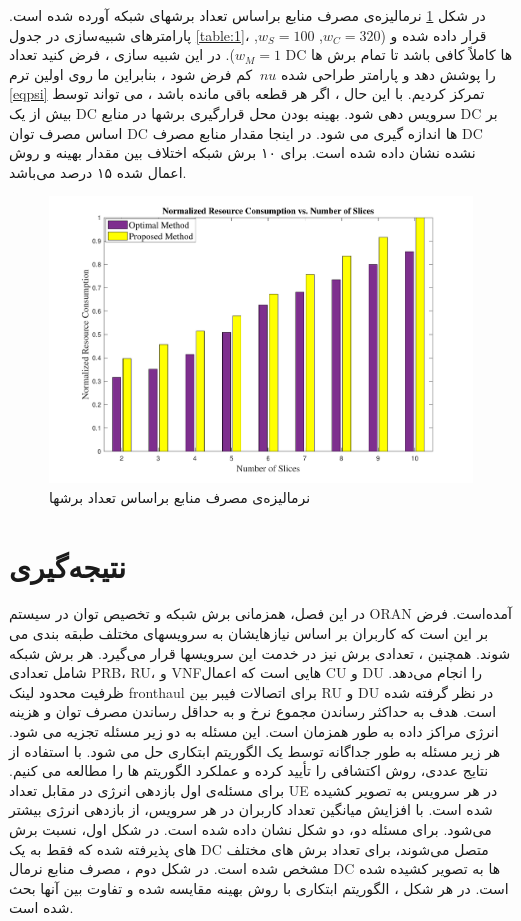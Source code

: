 در شکل \ref{fig:f2}
نرمالیزه‌ی مصرف منابع بر‌اساس تعداد برشهای شبکه آورده شده است. پارامترهای شبیه‌سازی در جدول \ref{table:1}، قرار داده شده و 
($w_C = 320$, $w_S = 100$, $w_M =1$).
در این شبیه سازی ، فرض کنید تعداد DC ها کاملاً کافی باشد تا تمام برش ها را پوشش دهد و پارامتر طراحی شده $ \ nu $ کم فرض شود ، بنابراین ما روی اولین ترم \eqref{eqpsi} تمرکز کردیم.
با این حال ، اگر هر قطعه باقی مانده باشد ، می تواند توسط بیش از یک DC سرویس دهی شود.
بهینه بودن محل قرارگیری برشها در منابع DC بر اساس مصرف توان DC ها اندازه گیری می شود.
در اینجا مقدار منابع  مصرف DC نشده نشان داده شده است. برای ۱۰ برش شبکه اختلاف بین مقدار بهینه و روش اعمال شده ۱۵ درصد می‌باشد. 
\begin{figure}%
	\centering
	\includegraphics[scale = 0.5]{./fig/fig22_last} %
	\caption{نرمالیزه‌ی مصرف منابع بر‌اساس تعداد برشها}
	\label{fig:f2}
\end{figure}
\section{نتیجه‌گیری}
در این فصل، همزمانی برش شبکه و تخصیص توان در سیستم ORAN آمده‌است. فرض بر این است که کاربران بر اساس نیازهایشان به سرویسهای مختلف طبقه بندی می شوند. همچنین ، تعدادی برش نیز در خدمت این سرویسها قرار می‌گیرد. هر برش شبکه شامل تعدادی PRB، RU، و VNFهایی است که اعمال CU و DU را انجام می‌دهد. ظرفیت محدود لینک fronthaul برای اتصالات فیبر بین RU و DU در نظر گرفته شده است.
هدف به حداکثر رساندن مجموع نرخ و به حداقل رساندن مصرف توان و هزینه انرژی مراکز داده به طور همزمان است.
این مسئله به دو زیر مسئله تجزیه می شود. هر زیر مسئله به طور جداگانه توسط یک الگوریتم ابتکاری حل می شود. با استفاده از نتایج عددی، روش اکتشافی را تأیید کرده و عملکرد الگوریتم ها را مطالعه می کنیم.
برای مسئله‌ی اول بازدهی انرژی در مقابل تعداد UE در هر سرویس به تصویر کشیده شده است.
با افزایش میانگین تعداد کاربران در هر سرویس، از بازدهی انرژی بیشتر می‌شود.
برای مسئله دو، دو شکل نشان داده شده است.
در شکل اول، نسبت برش های پذیرفته شده که فقط به یک DC متصل می‌شوند، برای تعداد برش های مختلف مشخص شده است.
در شکل دوم ، مصرف منابع نرمال DC ها به تصویر کشیده شده است.
در هر شکل ، الگوریتم ابتکاری با روش بهینه مقایسه شده و تفاوت بین آنها بحث شده است.

